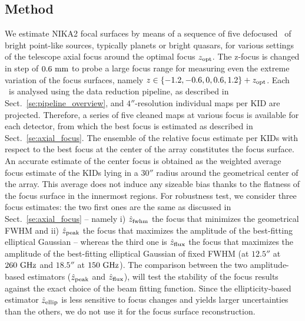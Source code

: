 \subsection{Method}

We estimate NIKA2 focal surfaces by means of a sequence of five
defocused \bms\ of bright
point-like sources, typically planets or bright quasars, for various settings of
the telescope axial focus around the optimal focus $z_{\rm{opt}}$.
The z-focus is changed in step of $0.6~\rm{mm}$ to probe a large
focus range for measuring even the extreme variation of the focus surfaces,
namely $z \in \{-1.2, -0.6, 0, 0.6, 1.2 \} + z_{\rm{opt}}$.  Each
\bm\ is analysed using the data reduction pipeline, as described in
Sect.~\ref{se:pipeline_overview}, and $4''$-resolution individual maps per KID
are projected. %
Therefore, a series of
five cleaned maps at various focus is available for each detector, from which
the best focus is estimated as described in Sect.~\ref{se:axial_focus}. The
ensemble of the relative focus estimate per KIDs with respect to the best focus
at the center of the array constitutes the focus surface. An accurate estimate
of the center focus is obtained as the weighted average focus estimate of the
KIDs lying in a $30''$ radius around the geometrical center of the array. This
average does not induce any sizeable bias thanks to the flatness of the focus
surface in the innermost regions. For robustness test, we consider three focus
estimates: the two first ones are the same as discussed in
Sect.~\ref{se:axial_focus} -- namely i) $\hat z_{\rm{fwhm}}$ the focus that
minimizes the geometrical FWHM and ii) $\hat z_{\rm{peak}}$ the focus that
maximizes the amplitude of the best-fitting elliptical Gaussian -- whereas the
third one is $\hat z_{\rm{flux}}$ the focus that maximizes the amplitude of the
best-fitting elliptical Gaussian of fixed FWHM (at $12.5''$ at $260~\rm{GHz}$ and
$18.5''$ at $150~\rm{GHz}$). The comparison between the two amplitude-based
estimators ($\hat z_{\rm{peak}}$ and $\hat z_{\rm{flux}}$), will test the
stability of the focus results against the exact choice of the beam fitting
function. Since the ellipticity-based estimator $\hat z_{\rm{ellip}}$ is less
sensitive to focus changes and yields larger uncertainties than the others, we
do not use it for the focus surface reconstruction.



